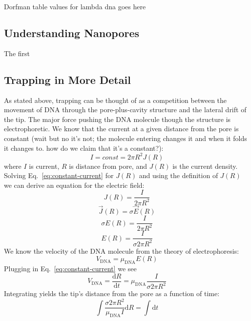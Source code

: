 \documentclass[aps,prl,preprint,groupedaddress]{revtex4}
\begin{document}
Dorfman table values for lambda dna goes here

\subsection{Understanding Nanopores}

The first 

\subsection{Trapping in More Detail}

As stated above, trapping can be thought of as a competition between the movement of DNA through the pore-plus-cavity structure and the lateral drift of the tip. The major force pushing the DNA molecule though the structure is electrophoretic. We know that the current at a given distance from the pore is constant (wait but no it's not; the molecule entering changes it and when it folds it changes to. how do we claim that it's a constant?): 
\begin{equation} I = const = 2 \pi R^2 J(R) \label{eq:constant-current}\end{equation} 
where \(I\) is current, \(R\) is distance from pore, and \(J(R)\) is the current density. Solving Eq.~\ref{eq:constant-current} for \(J(R)\) and using the definition of \(J(R)\) we can derive an equation for the electric field: 
\[J(R) = \frac{I}{2 \pi R^2}\] 
\[\overrightarrow{J}(R) = \sigma \overrightarrow{E}(R)\] 
\[\sigma E(R) = \frac{I}{2 \pi R^2}\] 
\begin{equation} E(R) = \frac{I}{\sigma 2 \pi R^2} \label{eq:electric-field} \end{equation} 
We know the velocity of the DNA molecule from the theory of electrophoresis: 
\begin{equation} V_{\mathrm{DNA}} = \mu_{\mathrm{DNA}} E(R) \label{eq:velocity} \end{equation} 
Plugging in Eq.~\ref{eq:constant-current} we see 
\[V_{\mathrm{DNA}} = \frac{\mathrm{d}R}{\mathrm{d}t} = \mu_{\mathrm{DNA}} \frac{I}{\sigma 2 \pi R^2}\] 
Integrating yields the tip's distance from the pore as a function of time: 
\[\int \frac{\sigma 2 \pi R^2}{\mu_{\mathrm{DNA}} I} \mathrm{d}R = \int \mathrm{d}t \]

\end{document}
